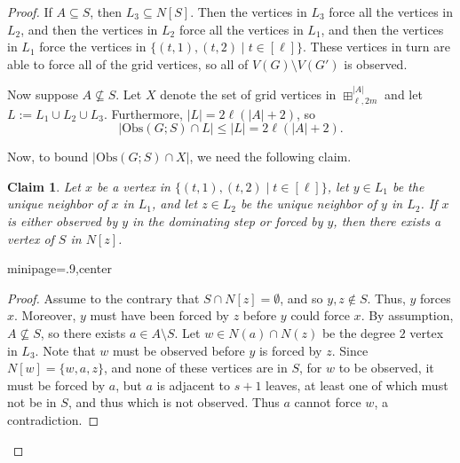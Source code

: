 \documentclass{article}
\newtheorem{claim}[theorem]{Claim}
\begin{document}
        \begin{proof}
            If $A\subseteq S$, then $L_3\subseteq N[S]$. 
            Then the vertices in $L_3$ force all the vertices in $L_2$, and then the vertices in $L_2$ force all the vertices in $L_1$, and then the vertices in $L_1$ force the vertices in $\{(t,1),(t,2)\mid t\in [\ell]\}$.
            These vertices in turn are able to force all of the grid vertices, so all of $V(G)\setminus V(G')$ is observed.
            
            Now suppose $A\not\subseteq S$.
            Let $X$ denote the set of grid vertices in $\boxplus_{\ell,2m}^{|A|}$ and let $L:=L_1\cup L_2\cup L_3$.
            Furthermore, $|L|=2\ell(|A|+2)$, so
            \begin{equation}\label{equation Obs cap L is at most the size of L}
                |\mathrm{Obs}(G;S)\cap L|\leq |L| = 2\ell(|A|+2).
            \end{equation}
            
            Now, to bound $|\mathrm{Obs}(G;S)\cap X|$, we need the following claim. 
       
            \begin{claim}\label{claim U has property U}
                Let $x$ be a vertex in $\{(t,1),(t,2)\mid t\in [\ell]\}$, let $y\in L_1$ be the unique neighbor of $x$ in $L_1$, and let $z\in L_2$ be the unique neighbor of $y$ in $L_2$.
                If $x$ is either observed by $y$ in the dominating step or forced by $y$, then there exists a vertex of $S$ in $N[z]$. 
            \end{claim}
            \begin{adjustbox}{minipage=\dimexpr.9\linewidth,center}
                \begin{proof}
                    Assume to the contrary that $S\cap N[z]=\emptyset$, and so $y,z\not\in S$.
                    Thus, $y$ forces $x$.
                    Moreover, $y$ must have been forced by $z$ before $y$ could force $x$. 
                    By assumption, $A\not\subseteq S$, so there exists $a\in A\setminus S$.
                    Let $w\in N(a)\cap N(z)$ be the degree $2$ vertex in $L_3$.
                    Note that $w$ must be observed before $y$ is forced by $z$.
                    Since $N[w]=\{w,a,z\}$, and none of these vertices are in $S$, for $w$ to be observed, it must be forced by $a$, but $a$ is adjacent to $s+1$ leaves, at least one of which must not be in $S$, and thus which is not observed.
                    Thus $a$ cannot force $w$, a contradiction.
                \end{proof}
            \end{adjustbox}\medskip
            

\end{proof}
\end{document}
